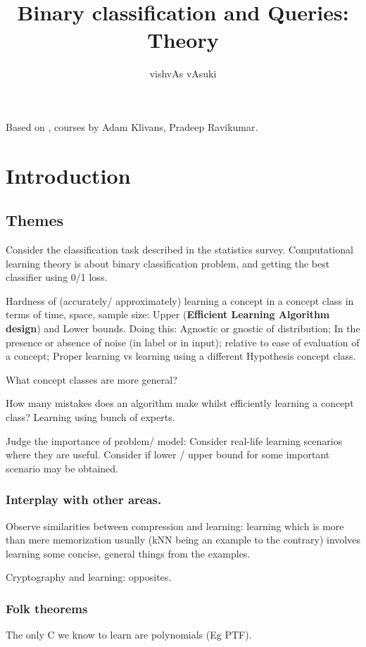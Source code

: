 \documentclass[oneside, article]{memoir}
\title{Binary classification and Queries: Theory}
\author{vishvAs vAsuki}
\begin{document}
\maketitle
\tableofcontents

Based on \cite{kearnsVazirani}, courses by Adam Klivans, Pradeep Ravikumar.

\part{Introduction}
\chapter{Themes}
Consider the classification task described in the statistics survey. Computational learning theory is about binary classification problem, and getting the best classifier using 0/1 loss.

Hardness of (accurately/ approximately) learning a concept in a concept class in terms of time, space, sample size: Upper (\textbf{Efficient Learning Algorithm design}) and Lower bounds. Doing this: Agnostic or gnostic of distribution; In the presence or absence of noise (in label or in input); relative to ease of evaluation of a concept; Proper learning vs learning using a different Hypothesis concept class.

What concept classes are more general?

How many mistakes does an algorithm make whilst efficiently learning a concept class? Learning using bunch of experts.

Judge the importance of problem/ model: Consider real-life learning scenarios where they are useful. Consider if lower / upper bound for some important scenario may be obtained.

\section{Interplay with other areas.}
Observe similarities between compression and learning: learning which is more than mere memorization usually (kNN being an example to the contrary) involves learning some concise, general things from the examples.

Cryptography and learning: opposites.

\section{Folk theorems}
The only C we know to learn are polynomials (Eg PTF).
\end{document}
